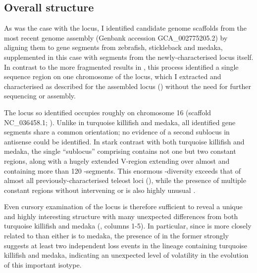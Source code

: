 \subsection{Overall structure}
\label{sec:xma-locus-structure}
	
As was the case with the \Nfu \igh{} locus, I identified candidate genome scaffolds from the most recent \xma genome assembly (Genbank accession GCA\_002775205.2) by aligning them to \igh{} gene segments from zebrafish, stickleback and medaka, supplemented in this case with segments from the newly-characterised \Nfu locus itself. In contrast to the more fragmented results in \Nfu, this process identified a single sequence region on one chromosome of the \Xma locus, which I extracted and characterised as described for the assembled \Nfu locus () without the need for further sequencing or assembly.

The \Xma \igh{} locus so identified occupies roughly  on chromosome 16 (scaffold NC\_036458.1; ). Unlike in turquoise killifish and medaka, all identified gene segments share a common orientation; no evidence of a second sublocus in antisense could be identified. In stark contrast with both turquoise killifish and medaka, the single ``sublocus'' comprising \Xma \igh{} contains not one but two  constant regions, along with a hugely extended V-region extending over almost  and containing more than 120 \vh-segments. This enormous \vh-diversity exceeds that of almost all previously-characterised teleost \igh{} loci (), while the presence of multiple  constant regions without intervening  or  is also highly unusual \parencite{fillatreau2013astonishing}. 

Even cursory examination of the \Xma \igh{} locus is therefore sufficient to reveal a unique and highly interesting structure with many unexpected differences from both turquoise killifish and medaka (, columns 1-5). In particular, since \Xma is more closely related to \Nfu than either is to medaka, the presence of  in the former strongly suggests at least two independent loss events in the lineage containing turquoise killifish and medaka, indicating an unexpected level of volatility in the evolution of this important isotype.
 
